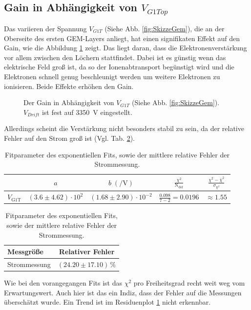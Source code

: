 \subsection{Gain in Abhängigkeit von $V_{G1Top}$}

Das variieren der Spannung $V_{G1T}$ (Siehe Abb. \ref{fig:SkizzeGem}), die an der Oberseite des ersten GEM-Layers anliegt, hat einen signifikaten Effekt auf den Gain, wie die Abbildung \ref{fig:VerstärkungV1GT} zeigt. Das liegt daran, dass die Elektronenverstärkung vor allem zwischen den Löchern stattfindet. Dabei ist es günstig wenn das elektrische Feld groß ist, da so der Ionenabtransport begünstigt wird und die Elektronen schnell genug beschleunigt werden um weitere Elektronen zu ionisieren. Beide Effekte erhöhen den Gain.

\begin{figure}[h]
    \centering
    
    \caption{Der Gain in Abhängigkeit von $V_{G1T}$ (Siehe Abb. \ref{fig:SkizzeGem}). $V_{Drift}$ ist fest auf \SI{3350}{\V} eingestellt.}
    \label{fig:VerstärkungV1GT}
\end{figure}
Allerdings scheint die Verstärkung nicht besonders stabil zu sein, da der relative Fehler auf den Strom groß ist (Vgl. Tab. \ref{tab:g1t_fit}).
\begin{table}[H]
    \centering
        \begin{tabular}{|l|c|c|c|c|}
        \hline
         & {$a$} & {$b\;(\si{\per\volt})$} & $\frac{\chi^2}{\text{N}_{\text{dof}}} $ & $\frac{\chi^2-\bar\chi^2}{\sigma_{\chi^2}}$ \\
        \hline
        $V_{\text{G1T}}$ & $(3.6 \pm 4.62) \cdot 10^{2}$ & $(1.68 \pm 2.90) \cdot 10^{-2}$&$\frac{0.098}{7-2}=0.0196$ & $\approx 1.55$\\
    \hline
    \end{tabular}

    \vspace{0.5cm}

    \begin{tabular}{|l|c|}
    \hline
        Messgröße & Relativer Fehler \\
        \hline
        Strommessung & $(24.20 \pm 17.10)\,\%$ \\
        \hline
    \end{tabular}
    \caption{Fitparameter des exponentiellen Fits, sowie der mittlere relative Fehler der Strommessung.}
    \label{tab:g1t_fit}
\end{table}
Wie bei den vorangegangen Fits ist das $\chi^2$ pro Freiheitsgrad recht weit weg vom Erwartungswert. Auch hier ist das ein Indiz, dass der Fehler auf die Messungen überschätzt wurde. Ein Trend ist im Residuenplot \ref{fig:VerstärkungV1GT} nicht erkennbar. \\
